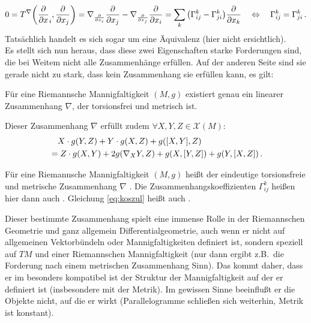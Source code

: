 \documentclass[../H_Analysis_main.tex]{subfiles}
\begin{document}
\begin{equation}
0 = T^\nabla\qty(\pdv{x}_i, \pdv{x_j}) = \nabla_{\pdv{x_i}} \pdv{x_j} - \nabla_{\pdv{x_j}} \pdv{x_i} = \sum_k \qty(\Gamma_{ij}^k - \Gamma_{ji}^k) \pdv{x_k} \quad \Leftrightarrow \quad \Gamma_{ij}^k = \Gamma_{ji}^k \, .
\end{equation}
Tatsächlich handelt es sich sogar um eine Äquivalenz (hier nicht ersichtlich).\\


Es stellt sich nun heraus, dass diese zwei Eigenschaften starke Forderungen sind, die bei Weitem nicht alle Zusammenhänge erfüllen. Auf der anderen Seite sind sie gerade nicht zu stark, dass kein Zusammenhang sie erfüllen kann, es gilt:
\begin{satz}
Für eine Riemannsche Mannigfaltigkeit $(M, g)$ existiert genau ein linearer Zusammenhang $\nabla$, der torsionsfrei und metrisch ist.

Dieser Zusammenhang $\nabla$ erfüllt zudem $\forall X, Y, Z \in \mathcal{X}(M)$:
\begin{equation}\label{eq:koszul}
\begin{split}
& \quad X \cdot g(Y, Z) + Y \cdot g(X, Z) + g\qty([X, Y], Z) 
\\
&= Z \cdot g(X, Y) + 2 g\qty(\nabla_X Y, Z) + g\qty(X, [Y, Z]) + g\qty(Y, [X, Z]) \, .
\end{split}
\end{equation}
\end{satz}

\begin{defi}
Für eine Riemannsche Mannigfaltigkeit $(M, g)$ heißt der eindeutige torsionsfreie und metrische Zusammenhang $\nabla$ . Die Zusammenhangskoeffizienten $\Gamma_{ij}^k$ heißen hier dann auch . Gleichung \eqref{eq:koszul} heißt auch .
\end{defi}
Dieser bestimmte Zusammenhang spielt eine immense Rolle in der Riemannschen Geometrie und ganz allgemein Differentialgeometrie, auch wenn er nicht auf allgemeinen Vektorbündeln oder Mannigfaltigkeiten definiert ist, sondern speziell auf $TM$ und einer Riemannschen Mannigfaltigkeit (nur dann ergibt z.B.~die Forderung nach einem metrischen Zusammenhang Sinn). Das kommt daher, dass er im besonders kompatibel ist der Struktur der Mannigfaltigkeit auf der er definiert ist (insbesondere mit der Metrik). Im gewissen Sinne beeinflußt er die Objekte nicht, auf die er wirkt (Parallelogramme schließen sich weiterhin, Metrik ist konstant).
\end{document}
